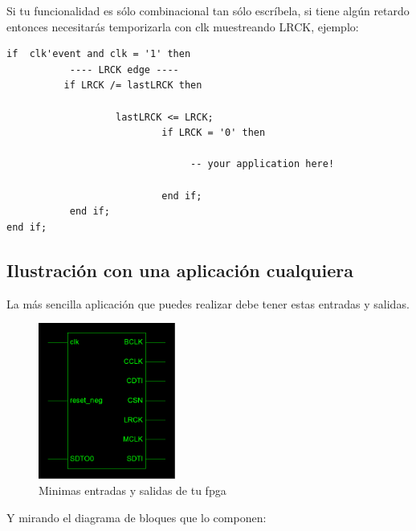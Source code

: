 	Si tu funcionalidad es sólo combinacional tan sólo escríbela, si tiene algún retardo entonces necesitarás temporizarla con clk muestreando LRCK, ejemplo:
	\begin{verbatim}
if  clk'event and clk = '1' then			
           ---- LRCK edge ----
          if LRCK /= lastLRCK then
					
                   lastLRCK <= LRCK;			
                           if LRCK = '0' then
                           
                                -- your application here!	
                                
                           end if;
           end if;
end if;
\end{verbatim}

	
 \newpage
	\subsection{Ilustración con una aplicación cualquiera}
		La más sencilla aplicación que puedes realizar debe tener estas entradas y salidas.\\
		\begin{figure}[H]
\begin{center}
	\includegraphics[width=0.4\textwidth]{./entity_fpga}
\caption{Minimas entradas y salidas de tu fpga}
\end{center}
\end{figure}
Y mirando el diagrama de bloques que lo componen:
